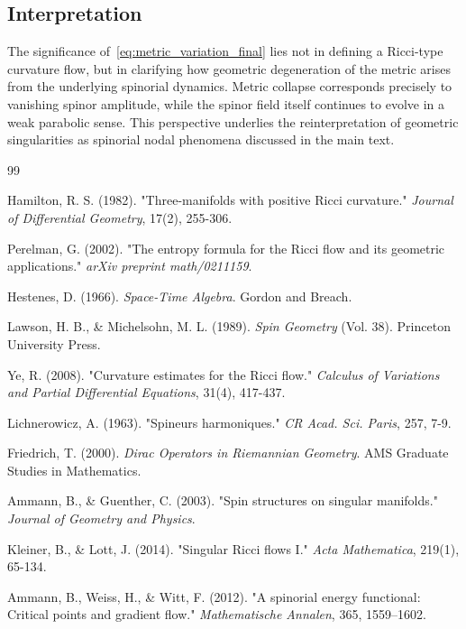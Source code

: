 \documentclass[11pt, reqno, a4paper]{amsart}
\theoremstyle{definition}
\theoremstyle{remark}
\begin{document}
\subsection{Interpretation}

The significance of~\eqref{eq:metric_variation_final} lies not in defining a
Ricci-type curvature flow, but in clarifying how geometric degeneration of the
metric arises from the underlying spinorial dynamics.
Metric collapse corresponds precisely to vanishing spinor amplitude, while the
spinor field itself continues to evolve in a weak parabolic sense.
This perspective underlies the reinterpretation of geometric singularities as
spinorial nodal phenomena discussed in the main text.


\begin{thebibliography}{99}

Hamilton, R. S. (1982). "Three-manifolds with positive Ricci curvature." \textit{Journal of Differential Geometry}, 17(2), 255-306.

Perelman, G. (2002). "The entropy formula for the Ricci flow and its geometric applications." \textit{arXiv preprint math/0211159}.

Hestenes, D. (1966). \textit{Space-Time Algebra}. Gordon and Breach.

Lawson, H. B., \& Michelsohn, M. L. (1989). \textit{Spin Geometry} (Vol. 38). Princeton University Press.

Ye, R. (2008). "Curvature estimates for the Ricci flow." \textit{Calculus of Variations and Partial Differential Equations}, 31(4), 417-437.

Lichnerowicz, A. (1963). "Spineurs harmoniques." \textit{CR Acad. Sci. Paris}, 257, 7-9.

Friedrich, T. (2000). \textit{Dirac Operators in Riemannian Geometry}. AMS Graduate Studies in Mathematics.

Ammann, B., \& Guenther, C. (2003). "Spin structures on singular manifolds." \textit{Journal of Geometry and Physics}.

Kleiner, B., \& Lott, J. (2014). "Singular Ricci flows I." \textit{Acta Mathematica}, 219(1), 65-134.

Ammann, B., Weiss, H., \& Witt, F. (2012). "A spinorial energy functional: Critical points and gradient flow." \textit{Mathematische Annalen}, 365, 1559–1602.


\end{thebibliography}
\end{document}
